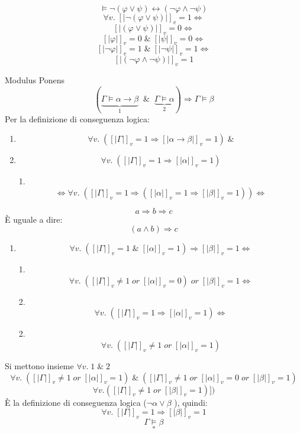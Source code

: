 \documentclass{article}
\theoremstyle{break}
\theoremstyle{break}
\theoremstyle{break}
\theoremstyle{break}
\begin{document}
\begin{figure}[H]
    \begin{exercise}
        \[
            \models \neg (\varphi \vee \psi) \leftrightarrow (\neg \varphi \wedge \neg \psi)
        \] 
        \[
            \forall v.\; [|\neg (\varphi \vee \psi)|]_v=1 \Leftrightarrow
        \] 
        \[
            [|(\varphi \vee \psi)|]_v=0 \Leftrightarrow
        \] 
        \[
            [|\varphi|]_v=0\; \&\; [|\psi|]_v=0 \Leftrightarrow
        \] 
        \[
            [|\neg \varphi|]_v=1 \; \&\; [|\neg \psi|]_v=1 \Leftrightarrow
        \] 
        \[
            [|(\neg \varphi \wedge \neg \psi)|]_v=1
        \] 
    \end{exercise}
\end{figure}
\begin{exercise}
    Modulus Ponens
    \[
        (\underbrace{\Gamma \models \alpha \to \beta}_{1}\;\;\&\;\; \underbrace{\Gamma \models \alpha}_{2}) \Rightarrow \Gamma \models \beta
    \] 
    Per la definizione di conseguenza logica:
    \begin{enumerate}
        \item \[
                \forall v.\; ([|\Gamma|]_v=1 \Rightarrow [|\alpha \to \beta|]_v=1) \;\&
        \] 
        \item \[
                \forall v.\; ([|\Gamma|]_v=1 \Rightarrow [|\alpha|]_v=1)
        \] 
    \item[1.] \[
            \Leftrightarrow \forall v.\; ([|\Gamma|]_v=1 \Rightarrow ([|\alpha|]_v=1 \Rightarrow [|\beta|]_v=1)) \Leftrightarrow
    \] 
    \end{enumerate}
    \begin{define}
        \[
        a \Rightarrow b \Rightarrow c
        \] 
        È uguale a dire:
        \[
            (a \wedge b) \Rightarrow c
        \] 
    \end{define}
    \begin{enumerate}
        \item 
        \[
            \forall v.\; ([|\Gamma|]_v=1\;\&\;[|\alpha|]_v=1) \Rightarrow [|\beta|]_v=1 \Leftrightarrow
        \] 
    \item[1.]\[
            \forall v.\; ([|\Gamma|]_v \neq 1\; or\; [|\alpha|]_v=0)\; or\; [|\beta|]_v=1 \Leftrightarrow
    \] 
\item[2.]\[
        \forall v.\; ([|\Gamma|]_v=1 \Rightarrow [|\alpha|]_v = 1) \Leftrightarrow
\]
\item[2.]
\[
   \forall v.\; ([|\Gamma|]_v \neq 1\; or\; [|\alpha|]_v=1)  
\] 
    \end{enumerate}
    Si mettono insieme \(\forall v.\; 1\; \&\; 2 \) 
    \[
        \forall v.\; ([|\Gamma|]_v \neq 1\; or\; [|\alpha|]_v=1)\; \&\; ([|\Gamma|]_v \neq 1\; or\; [|\alpha|]_v=0\; or\; [|\beta|]_v=1)
    \] 
    \[
        \forall v.([|\Gamma|]_v \neq 1\; or\; [|\beta|]_v=1)])
    \]
    È la definizione di conseguenza logica (\( \neg \alpha \vee \beta \) ), quindi:
    \[
        \forall v. \;[|\Gamma|]_v=1 \Rightarrow [|\beta|]_v=1
    \] 
    \[
    \Gamma \models \beta
    \] 
    \[
    \square
    \]  
\end{exercise}
\end{document}
